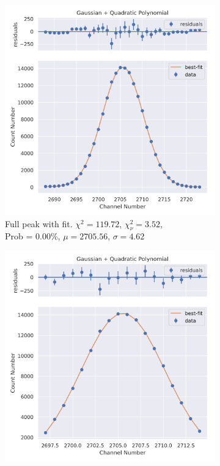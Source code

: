 \documentclass[11pt,a4paper]{article}
\begin{document}
\begin{figure}[H]
  \centering
  \begin{subfigure}{.5\linewidth}
    \centering
    \includegraphics[width=\linewidth]{./Images/Barium133/Quad/Quad_7_Full.png}
    \caption{Full peak with fit. $\chi^2 = 119.72$, $\chi^2_\nu = 3.52$, \\ Prob = 0.00\%, $\mu = 2705.56$, $\sigma = 4.62$}
  \end{subfigure}%
  \begin{subfigure}{.5\linewidth}
    \centering
    \includegraphics[width=\linewidth]{./Images/Barium133/Quad/Quad_7_Zoom.png}

\end{subfigure}
\end{figure}
\end{document}
